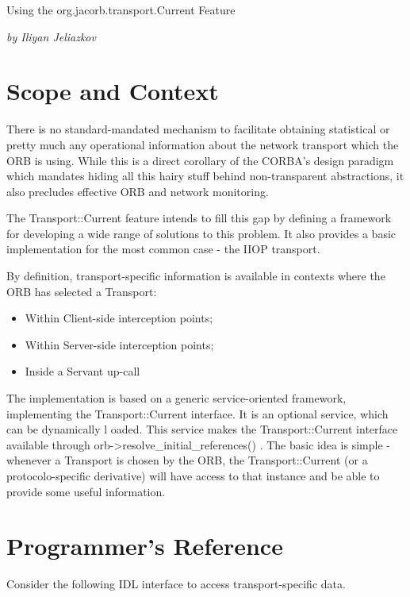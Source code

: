 %
%

Using the org.jacorb.transport.Current Feature

\em{by Iliyan Jeliazkov}

\section{Scope and Context}

There is no standard-mandated mechanism to facilitate obtaining statistical or pretty 
much any operational information about the network transport which the ORB is using. 
While this is a direct corollary of the CORBA's design paradigm which mandates hiding 
all this hairy stuff behind non-transparent abstractions, it also precludes effective 
ORB and network monitoring. 

The Transport::Current feature intends to fill this gap by defining a framework 
for developing a wide range of solutions to this problem. It also provides a basic 
implementation for the most common case - the IIOP transport. 

By definition, transport-specific information is available in contexts where the 
ORB has selected a Transport:

\begin{itemize}
\item Within Client-side interception points; 
\item Within Server-side interception points; 
\item Inside a Servant up-call 
\end{itemize}

The implementation is based on a generic service-oriented framework, implementing 
the Transport::Current interface. It is an optional service, which can be dynamically l
oaded. This service makes the Transport::Current interface available through 
orb->resolve\_initial\_references() . The basic idea is simple - whenever a Transport 
is chosen by the ORB, the Transport::Current (or a protocolo-specific derivative) 
will have access to that instance and be able to provide some useful information. 



\section{Programmer's Reference}

Consider the following IDL interface to access transport-specific data. 

